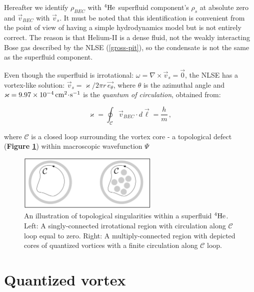 Hereafter we identify $\rho_{BEC}$ with ${}^4\mathrm{He}$ superfluid component's $\rho_s$ at absolute zero and $\vec{v}_{BEC}$ with $\vec{v}_s$. It must be noted that this identification is convenient from the point of view of having a simple hydrodynamics model but is not entirely correct. The reason is
that Helium-II is a dense fluid, not the weakly interacting Bose gas described
by the NLSE (\ref{gross-pit}), so the condensate is not the same as the superfluid component.

\newpage

Even though the superfluid is irrotational: $\omega = \nabla \times \vec{v}_s = \vec{0}$, the NLSE has a vortex-like solution: $\vec{v}_s = \varkappa / 2\pi r\, \vec{e_{\theta}}$, where $\theta$ is the azimuthal angle and $\varkappa=9.97 \times 10^{-4} \,\mathrm{cm^2 \!\cdot\! s^{-1}}$ is the \textit{quantum of circulation}, obtained from:

\begin{equation}
\varkappa = \oint_{\mathcal{C}} \vec{v}_{BEC} \cdot \unit{d}\vec{\boldsymbol{\ell}} = \frac{h}{m}\,,
\label{varkappa}
\end{equation}

where $\mathcal{C}$ is a closed loop surrounding the vortex core - a topological defect (\textbf{Figure {\ref{singularity}}}) within macroscopic wavefunction $\Psi$

\begin{figure}[h]
	\centering
	\includegraphics[width=0.6\textwidth]{graphics/theory/singularity}
	\caption{An illustration of topological singularities within a superfluid ${}^4\mathrm{He}$. Left: A singly-connected irrotational region with circulation along $\mathcal{C}$ loop equal to zero. Right: A multiply-connected region with depicted cores of quantized vortices with a finite circulation along $\mathcal{C}$ loop.}
	\label{singularity}
\end{figure}


\section{Quantized vortex}

